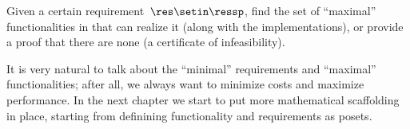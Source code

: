 \begin{problem}[FixReqMinFun]
\label{prob:FixReqMinFun-informal}
Given a certain requirement~$\res\setin\ressp$, find the set of ``maximal'' functionalities in that can realize it (along with the implementations), or provide a proof that there are none (a certificate of infeasibility).
\end{problem}

It is very natural to talk about the ``minimal'' requirements and ``maximal'' functionalities; after all, we always want to minimize costs and maximize performance.
In the next chapter we start to put more mathematical scaffolding in place, starting from definining functionality and requirements as posets.


